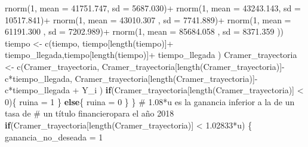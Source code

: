 \documentclass[
  us-letterpaper,
]{scrreprt}
\newenvironment{Shaded}{\begin{snugshade}}{\end{snugshade}}
\newcommand{\AttributeTok}[1]{\textcolor[rgb]{0.40,0.45,0.13}{#1}}
\newcommand{\CommentTok}[1]{\textcolor[rgb]{0.37,0.37,0.37}{#1}}
\newcommand{\ControlFlowTok}[1]{\textcolor[rgb]{0.00,0.23,0.31}{\textbf{#1}}}
\newcommand{\DecValTok}[1]{\textcolor[rgb]{0.68,0.00,0.00}{#1}}
\newcommand{\FloatTok}[1]{\textcolor[rgb]{0.68,0.00,0.00}{#1}}
\newcommand{\FunctionTok}[1]{\textcolor[rgb]{0.28,0.35,0.67}{#1}}
\newcommand{\NormalTok}[1]{\textcolor[rgb]{0.00,0.23,0.31}{#1}}
\newcommand{\OtherTok}[1]{\textcolor[rgb]{0.00,0.23,0.31}{#1}}
\newcommand{\SpecialCharTok}[1]{\textcolor[rgb]{0.37,0.37,0.37}{#1}}
\theoremstyle{definition}
\theoremstyle{plain}
\theoremstyle{plain}
\theoremstyle{remark}
\begin{document}
\begin{Shaded}
\begin{Highlighting}[]
              \FunctionTok{rnorm}\NormalTok{(}\DecValTok{1}\NormalTok{, }\AttributeTok{mean =}   \FloatTok{41751.747}\NormalTok{, }\AttributeTok{sd =} \FloatTok{5687.030}\NormalTok{)}\SpecialCharTok{+} 
              \FunctionTok{rnorm}\NormalTok{(}\DecValTok{1}\NormalTok{, }\AttributeTok{mean =}   \FloatTok{43243.143}\NormalTok{, }\AttributeTok{sd =} \FloatTok{10517.841}\NormalTok{)}\SpecialCharTok{+} 
              \FunctionTok{rnorm}\NormalTok{(}\DecValTok{1}\NormalTok{, }\AttributeTok{mean =} \FloatTok{43010.307}\NormalTok{  , }\AttributeTok{sd =} \FloatTok{7741.889}\NormalTok{)}\SpecialCharTok{+} 
              \FunctionTok{rnorm}\NormalTok{(}\DecValTok{1}\NormalTok{, }\AttributeTok{mean =} \FloatTok{61191.300}\NormalTok{  , }\AttributeTok{sd =} \FloatTok{7202.989}\NormalTok{)}\SpecialCharTok{+} 
              \FunctionTok{rnorm}\NormalTok{(}\DecValTok{1}\NormalTok{, }\AttributeTok{mean =}  \FloatTok{85684.058}\NormalTok{ , }\AttributeTok{sd =} \FloatTok{8371.359}\NormalTok{ )) }
\NormalTok{    tiempo }\OtherTok{\textless{}{-}} \FunctionTok{c}\NormalTok{(tiempo, tiempo[}\FunctionTok{length}\NormalTok{(tiempo)]}\SpecialCharTok{+} 
\NormalTok{                  tiempo\_llegada,tiempo[}\FunctionTok{length}\NormalTok{(tiempo)]}\SpecialCharTok{+} 
\NormalTok{                  tiempo\_llegada ) }
\NormalTok{    Cramer\_trayectoria }\OtherTok{\textless{}{-}} \FunctionTok{c}\NormalTok{(Cramer\_trayectoria,}
\NormalTok{                      Cramer\_trayectoria[}\FunctionTok{length}\NormalTok{(Cramer\_trayectoria)]}\SpecialCharTok{{-}}
\NormalTok{                      c}\SpecialCharTok{*}\NormalTok{tiempo\_llegada, }
\NormalTok{                      Cramer\_trayectoria[}\FunctionTok{length}\NormalTok{(Cramer\_trayectoria)]}\SpecialCharTok{{-}} 
\NormalTok{                      c}\SpecialCharTok{*}\NormalTok{tiempo\_llegada }\SpecialCharTok{+}\NormalTok{  Y\_i )}
    \ControlFlowTok{if}\NormalTok{(Cramer\_trayectoria[}\FunctionTok{length}\NormalTok{(Cramer\_trayectoria)] }\SpecialCharTok{\textless{}} \DecValTok{0}\NormalTok{)\{}
\NormalTok{      ruina }\OtherTok{=} \DecValTok{1}
\NormalTok{    \}}
    \ControlFlowTok{else}\NormalTok{\{}
\NormalTok{      ruina }\OtherTok{=} \DecValTok{0}
\NormalTok{    \}}
\NormalTok{  \}}
\CommentTok{\# 1.08*u es la ganancia inferior a la de un tasa de }
\CommentTok{\# un título financieropara el año 2018}
  \ControlFlowTok{if}\NormalTok{(Cramer\_trayectoria[}\FunctionTok{length}\NormalTok{(Cramer\_trayectoria)] }\SpecialCharTok{\textless{}} \FloatTok{1.02833}\SpecialCharTok{*}\NormalTok{u) \{}
\NormalTok{    ganancia\_no\_deseada }\OtherTok{=} \DecValTok{1}
    

\end{Highlighting}
\end{Shaded}
\end{document}
